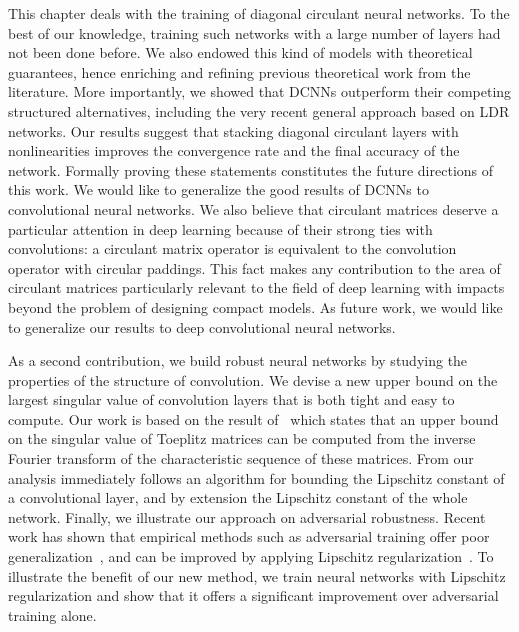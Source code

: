 {%

This chapter deals with the training of diagonal circulant neural networks.
To the best of our knowledge, training such networks with a large number of layers had not been done before.
We also endowed this kind of models with theoretical guarantees, hence enriching and refining previous theoretical work from the literature.
More importantly, we showed that DCNNs outperform their competing structured alternatives, including the very recent general approach based on LDR networks.
Our results suggest that stacking diagonal circulant layers with nonlinearities improves the convergence rate and the final accuracy of the network.
Formally proving these statements constitutes the future directions of this work.
We would like to generalize the good results of DCNNs to convolutional neural networks.
We also believe that circulant matrices deserve a particular attention in deep learning because of their strong ties with convolutions: a circulant matrix operator is equivalent to the convolution operator with circular paddings.
This fact makes any contribution to the area of circulant matrices particularly relevant to the field of deep learning with impacts beyond the problem of designing compact models.
As future work, we would like to generalize our results to deep convolutional neural networks. 












As a second contribution, we build robust neural networks by studying the properties of the structure of convolution.
We devise a new upper bound on the largest singular value of convolution layers that is both tight and easy to compute.
Our work is based on the result of~\citet{gray2006toeplitz} which states that an upper bound on the singular value of Toeplitz matrices can be computed from the inverse Fourier transform of the characteristic sequence of these matrices.
From our analysis immediately follows an algorithm for bounding the Lipschitz constant of a convolutional layer, and by extension the Lipschitz constant of the whole network.
Finally, we illustrate our approach on adversarial robustness.
Recent work has shown that empirical methods such as adversarial training offer poor generalization~\cite{schmidt2018adversarially}, and can be improved by applying Lipschitz regularization~\cite{farnia2018generalizable}.
To illustrate the benefit of our new method, we train neural networks with Lipschitz regularization and show that it offers a significant improvement over adversarial training alone.


}

